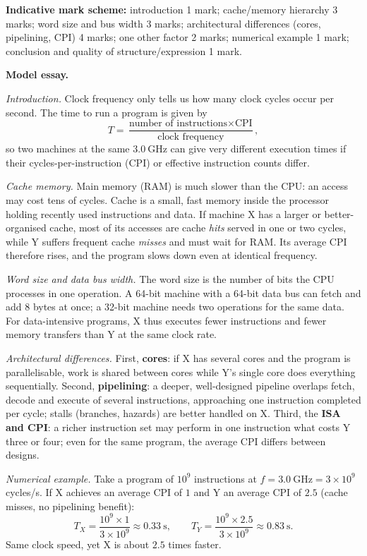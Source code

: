 \documentclass[11pt]{article}
\begin{document}
\begin{corrige}
\textbf{Indicative mark scheme:} introduction 1 mark; cache/memory hierarchy 3 marks; word size and bus width 3 marks; architectural differences (cores, pipelining, CPI) 4 marks; one other factor 2 marks; numerical example 1 mark; conclusion and quality of structure/expression 1 mark.

\textbf{Model essay.}

\emph{Introduction.} Clock frequency only tells us how many clock cycles occur per second. The time to run a program is given by
\[ T = \frac{\text{number of instructions} \times \text{CPI}}{\text{clock frequency}}, \]
so two machines at the same $3.0\ \mathrm{GHz}$ can give very different execution times if their cycles-per-instruction (CPI) or effective instruction counts differ.

\emph{Cache memory.} Main memory (RAM) is much slower than the CPU: an access may cost tens of cycles. Cache is a small, fast memory inside the processor holding recently used instructions and data. If machine X has a larger or better-organised cache, most of its accesses are cache \emph{hits} served in one or two cycles, while Y suffers frequent cache \emph{misses} and must wait for RAM. Its average CPI therefore rises, and the program slows down even at identical frequency.

\emph{Word size and data bus width.} The word size is the number of bits the CPU processes in one operation. A 64-bit machine with a 64-bit data bus can fetch and add 8 bytes at once; a 32-bit machine needs two operations for the same data. For data-intensive programs, X thus executes fewer instructions and fewer memory transfers than Y at the same clock rate.

\emph{Architectural differences.} First, \textbf{cores}: if X has several cores and the program is parallelisable, work is shared between cores while Y's single core does everything sequentially. Second, \textbf{pipelining}: a deeper, well-designed pipeline overlaps fetch, decode and execute of several instructions, approaching one instruction completed per cycle; stalls (branches, hazards) are better handled on X. Third, the \textbf{ISA and CPI}: a richer instruction set may perform in one instruction what costs Y three or four; even for the same program, the average CPI differs between designs.

\emph{Numerical example.} Take a program of $10^9$ instructions at $f = 3.0\ \mathrm{GHz} = 3\times10^9$ cycles/s. If X achieves an average CPI of $1$ and Y an average CPI of $2.5$ (cache misses, no pipelining benefit):
\[ T_X = \frac{10^9 \times 1}{3\times10^9} \approx 0.33\ \mathrm{s}, \qquad T_Y = \frac{10^9 \times 2.5}{3\times10^9} \approx 0.83\ \mathrm{s}. \]
Same clock speed, yet X is about $2.5$ times faster.


\end{corrige}
\end{document}
